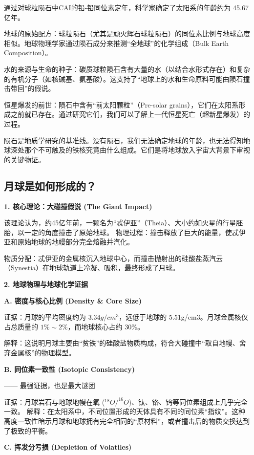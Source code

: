 \documentclass[12pt,a4paper]{article}
\begin{document}
	通过对球粒陨石中CAI的铅-铅同位素定年，科学家确定了太阳系的年龄约为 45.67 亿年。
	
	地球的原始配方：球粒陨石（尤其是顽火辉石球粒陨石）的同位素比例与地球高度相似。地球物理学家通过陨石成分来推测“全地球”的化学组成（Bulk Earth Composition）。
	
	水的来源与生命的种子：碳质球粒陨石含有大量的水（以结合水形式存在）和复杂的有机分子（如核碱基、氨基酸）。这支持了“地球上的水和生命原料可能由陨石撞击带回”的假说。
	
	恒星爆发的前世：陨石中含有“前太阳颗粒”（Pre-solar grains），它们在太阳系形成之前就已存在。通过研究它们，我们可以了解上一代恒星死亡（超新星爆发）的过程。
	
	
	陨石是地质学研究的基准线。没有陨石，我们无法确定地球的年龄，也无法得知地球深处那个不可触及的铁核究竟由什么组成。它们是将地球放入宇宙大背景下审视的关键物证。
	
	\subsection{月球是如何形成的？}
	\textbf{1. 核心理论：大碰撞假说 (The Giant Impact)}
	
	该理论认为，约45亿年前，一颗名为“忒伊亚”（Theia）、大小约如火星的行星胚胎，以一定的角度撞击了原始地球。
	物理过程：撞击释放了巨大的能量，使忒伊亚和原始地球的地幔部分完全熔融并汽化。
	
	物质分配：忒伊亚的金属核沉入地球中心，而撞击抛射出的硅酸盐蒸汽云（Synestia）在地球轨道上冷凝、吸积，最终形成了月球。
	
	\textbf{2. 地球物理与地球化学证据}
	
	\textbf{A. 密度与核心比例 (Density \& Core Size)}
	
	证据：月球的平均密度约为 $3.34g/cm^3$，远低于地球的 5.51g/cm3。月球金属核仅占总质量的 $1\%∼2\%$，而地球核心占约 $30\%$。
	
	解释：这说明月球主要由“贫铁”的硅酸盐物质构成，符合大碰撞中“取自地幔、舍弃金属核”的物理模型。
	
	\textbf{B. 同位素一致性 (Isotopic Consistency) }
	
	—— 最强证据，也是最大谜团
	
	证据：月球岩石与地球地幔在氧 ($^{18}O/^{16}O$)、钛、铬、钨等同位素组成上几乎完全一致。
	解释：在太阳系中，不同位置形成的天体具有不同的同位素“指纹”。这种高度一致性暗示月球和地球拥有完全相同的“原材料”，或者撞击后的物质交换达到了极致的平衡。
	
	\textbf{C. 挥发分亏损 (Depletion of Volatiles)}
	
\end{document}
